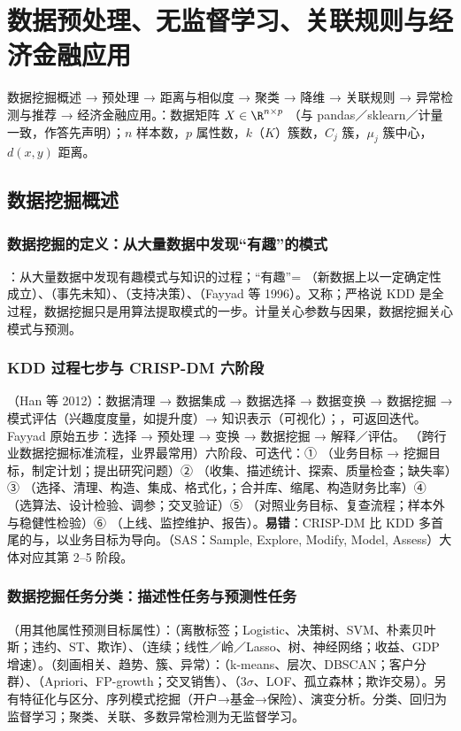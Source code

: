 \chapter{数据预处理、无监督学习、关联规则与经济金融应用}
\noindent{}\quad 数据挖掘概述 → 预处理 → 距离与相似度 → 聚类 → 降维 → 关联规则 → 异常检测与推荐 → 经济金融应用。：数据矩阵 $X\in\R^{n\times p}$ （与 pandas／sklearn／计量一致，作答先声明）；$n$ 样本数，$p$ 属性数，$k$（$K$）簇数，$C_j$ 簇，$\mu_j$ 簇中心，$d(x,y)$ 距离。

\section{数据挖掘概述}

\subsection{数据挖掘的定义：从大量数据中发现“有趣”的模式}
：从大量数据中发现有趣模式与知识的过程；“有趣”= （新数据上以一定确定性成立）、（事先未知）、（支持决策）、（Fayyad 等 1996）。又称；严格说 KDD 是全过程，数据挖掘只是用算法提取模式的一步。计量关心参数与因果，数据挖掘关心模式与预测。

\subsection{KDD 过程七步与 CRISP-DM 六阶段}
（Han 等 2012）：数据清理 → 数据集成 → 数据选择 → 数据变换 → 数据挖掘 → 模式评估（兴趣度度量，如提升度）→ 知识表示（可视化）；，可返回迭代。Fayyad 原始五步：选择 → 预处理 → 变换 → 数据挖掘 → 解释／评估。
（跨行业数据挖掘标准流程，业界最常用）六阶段、可迭代：① （业务目标 → 挖掘目标，制定计划；提出研究问题）② （收集、描述统计、探索、质量检查；缺失率）③ （选择、清理、构造、集成、格式化，；合并库、缩尾、构造财务比率）④ （选算法、设计检验、调参；交叉验证）⑤ （对照业务目标、复查流程；样本外与稳健性检验）⑥ （上线、监控维护、报告）。\textbf{易错}：CRISP-DM 比 KDD 多首尾的与，以业务目标为导向。（SAS：Sample, Explore, Modify, Model, Assess）大体对应其第 2–5 阶段。

\subsection{数据挖掘任务分类：描述性任务与预测性任务}
（用其他属性预测目标属性）：（离散标签；Logistic、决策树、SVM、朴素贝叶斯；违约、ST、欺诈）、（连续；线性／岭／Lasso、树、神经网络；收益、GDP 增速）。（刻画相关、趋势、簇、异常）：（k-means、层次、DBSCAN；客户分群）、（Apriori、FP-growth；交叉销售）、（3$\sigma$、LOF、孤立森林；欺诈交易）。另有特征化与区分、序列模式挖掘（开户→基金→保险）、演变分析。分类、回归为监督学习；聚类、关联、多数异常检测为无监督学习。

